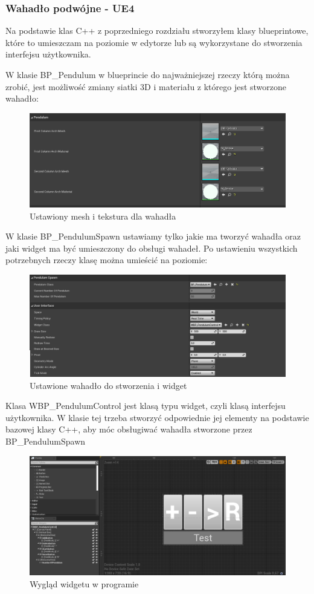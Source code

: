 \documentclass[a4paper,12pt,reqno]{article}
\begin{document}
\subsubsection{Wahadło podwójne - UE4}
{\color{red}
Na podstawie klas C++ z poprzedniego rozdziału stworzyłem klasy blueprintowe, które to umieszczam na poziomie w edytorze lub są wykorzystane do stworzenia interfejsu użytkownika.


W klasie BP\_Pendulum w blueprincie do najważniejszej rzeczy którą można zrobić, jest możliwość zmiany siatki 3D i materiału z którego jest stworzone wahadło:

\begin{figure}[H]%
\centering
\includegraphics[width=0.7\columnwidth]{graphics/pendulum/PendulumBP.png}
\caption{Ustawiony mesh i tekstura dla wahadła 
\label{BPExample}}%
%
\qquad
\end{figure}  

W klasie BP\_PendulumSpawn ustawiamy tylko jakie ma tworzyć wahadła oraz jaki widget ma być umieszczony do obsługi wahadeł. Po ustawieniu wszystkich potrzebnych rzeczy klasę można umieścić na poziomie:

\begin{figure}[H]%
\centering
\includegraphics[width=0.7\columnwidth]{graphics/pendulum/PendulumSpawnerBP.png}
\caption{Ustawione wahadło do stworzenia i widget 
\label{BPExample}}%
%
\qquad
\end{figure}  

 
Klasa WBP\_PendulumControl jest klasą typu widget, czyli klasą interfejsu użytkownika. W klasie tej trzeba stworzyć odpowiednie jej elementy na podstawie bazowej klasy C++, aby móc obsługiwać wahadła stworzone przez BP\_PendulumSpawn
}

\begin{figure}[H]%
\centering
\includegraphics[width=0.7\columnwidth]{graphics/pendulum/PendulumControlBP.png}
\caption{Wygląd widgetu w programie
\label{BPExample}}%
%
\qquad
\end{figure}  
\end{document}
